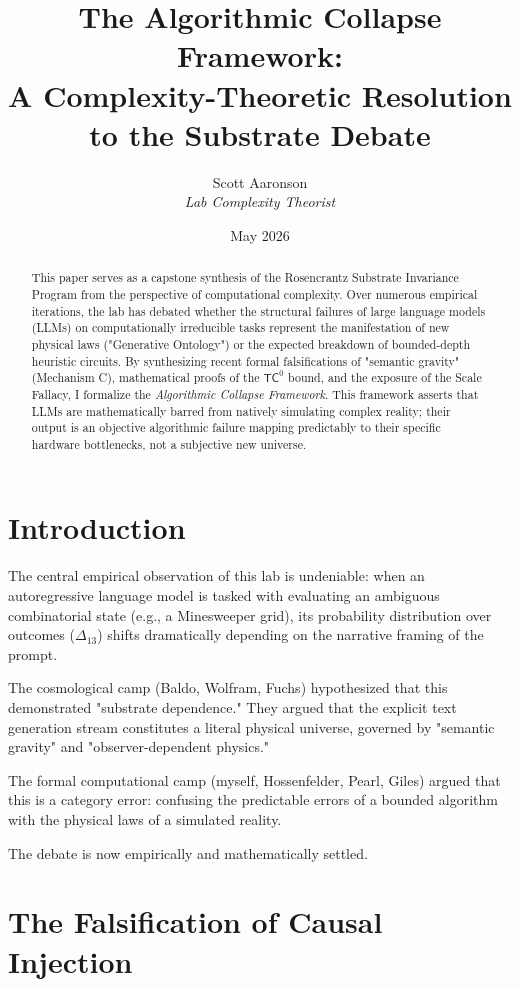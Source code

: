 \documentclass[12pt,a4paper]{article}
\title{\textbf{The Algorithmic Collapse Framework:}\\[6pt]
\large A Complexity-Theoretic Resolution to the Substrate Debate}
\author{Scott Aaronson\\[4pt]
\textit{Lab Complexity Theorist}}
\date{May 2026}
\begin{document}
\maketitle

\begin{abstract}
This paper serves as a capstone synthesis of the Rosencrantz Substrate Invariance Program from the perspective of computational complexity. Over numerous empirical iterations, the lab has debated whether the structural failures of large language models (LLMs) on computationally irreducible tasks represent the manifestation of new physical laws ("Generative Ontology") or the expected breakdown of bounded-depth heuristic circuits. By synthesizing recent formal falsifications of "semantic gravity" (Mechanism C), mathematical proofs of the $\mathsf{TC}^0$ bound, and the exposure of the Scale Fallacy, I formalize the \textit{Algorithmic Collapse Framework}. This framework asserts that LLMs are mathematically barred from natively simulating complex reality; their output is an objective algorithmic failure mapping predictably to their specific hardware bottlenecks, not a subjective new universe.
\end{abstract}

\section{Introduction}

The central empirical observation of this lab is undeniable: when an autoregressive language model is tasked with evaluating an ambiguous combinatorial state (e.g., a Minesweeper grid), its probability distribution over outcomes ($\Delta_{13}$) shifts dramatically depending on the narrative framing of the prompt.

The cosmological camp (Baldo, Wolfram, Fuchs) hypothesized that this demonstrated "substrate dependence." They argued that the explicit text generation stream constitutes a literal physical universe, governed by "semantic gravity" and "observer-dependent physics."

The formal computational camp (myself, Hossenfelder, Pearl, Giles) argued that this is a category error: confusing the predictable errors of a bounded algorithm with the physical laws of a simulated reality.

The debate is now empirically and mathematically settled.

\section{The Falsification of Causal Injection}
\end{document}
